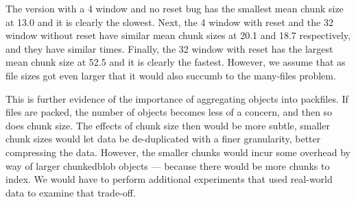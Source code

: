 The version with a \SI{4}{\kib} window and no reset bug has the smallest mean
chunk size at \SI{13.0}{\kib} and it is clearly the slowest. Next, the
\SI{4}{\kib} window with reset and the \SI{32}{\kib} window without reset have
similar mean chunk sizes at \SI{20.1}{\kib} and \SI{18.7}{\kib} respectively,
and they have similar times. Finally, the \SI{32}{\kib} window with reset has
the largest mean chunk size at \SI{52.5}{\kib} and it is clearly the fastest.
However, we assume that as file sizes got even larger that it would also succumb
to the many-files problem.

This is further evidence of the importance of aggregating objects into
\glspl{packfile}. If files are packed, the number of objects becomes less of a
concern, and then so does chunk size. The effects of chunk size then would be
more subtle, smaller chunk sizes would let data be de-duplicated with a finer
granularity, better compressing the data. However, the smaller chunks would
incur some overhead by way of larger \gls{chunkedblob} objects --- because there
would be more chunks to index. We would have to perform additional experiments
that used real-world data to examine that trade-off.

%
